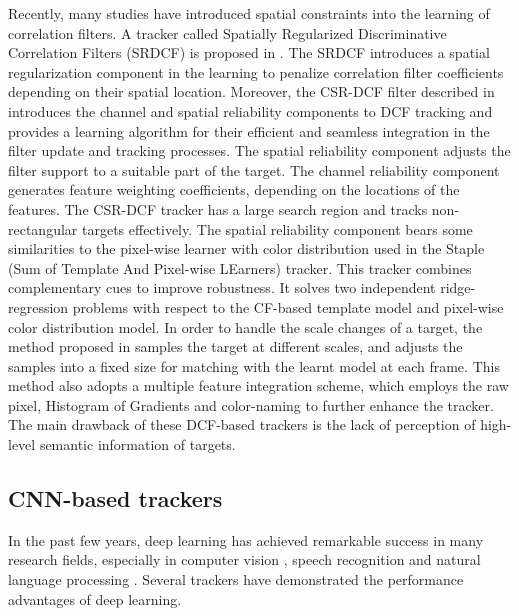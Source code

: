 Recently, many studies \cite{Danelljan2015LearningSR, Lukezic2017DiscriminativeCF} have introduced spatial constraints into the learning of correlation filters. A tracker called Spatially Regularized Discriminative Correlation Filters (SRDCF) is proposed in \cite{Danelljan2015LearningSR}. The SRDCF introduces a spatial regularization component in the learning to penalize correlation filter coefficients depending on their spatial location.
Moreover, the CSR-DCF filter described in \cite{Lukezic2017DiscriminativeCF} introduces the channel and spatial reliability components to DCF tracking and provides a learning algorithm for their efficient and seamless integration in the filter update and tracking processes. The spatial reliability component adjusts the filter support to a suitable part of the target. The channel reliability component generates feature weighting coefficients, depending on the locations of the features. The CSR-DCF tracker has a large search region and tracks non-rectangular targets effectively. The spatial reliability component bears some similarities to the pixel-wise learner with color distribution used in the Staple (Sum of Template And Pixel-wise LEarners) \cite{Bertinetto2016StapleC} tracker. This tracker combines complementary cues to improve robustness. It solves two independent ridge-regression problems with respect to the CF-based template model and pixel-wise color distribution model.
In order to handle the scale changes of a target, the method proposed in \cite{Li2014ASA} samples the target at different scales, and adjusts the samples into a fixed size for matching with the learnt model at each frame. This method also adopts a multiple feature integration scheme, which employs the raw pixel, Histogram of Gradients \cite{Forsyth2014ObjectDW} and color-naming \cite{Weijer2009LearningCN} to further enhance the tracker. The main drawback of these DCF-based trackers is the lack of perception of high-level semantic information of targets.

\subsection{CNN-based trackers}
In the past few years, deep learning \cite{Goodfellow2015DeepL} has achieved remarkable success in many research fields, especially in computer vision \cite{Matiz2019InductiveCP, Zhu2019RotatedCR, Xiao2019DenseSE}, speech recognition \cite{Kim2016JointCB, Liu2019AttentionGD} and natural language processing \cite{Vinyals2014GrammarAA, Yousfi2017ContributionOR}. Several trackers have demonstrated the performance advantages of deep learning. 

